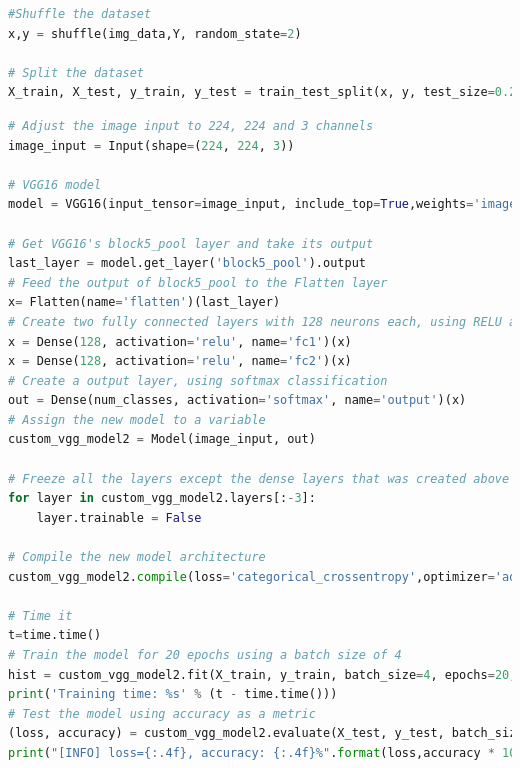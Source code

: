 \begin{lstlisting}[frame=single, language=Python, label={code:shuffle_and_split_data}, caption={Code to shuffle and split the data to 80\% training and 20\% test.}]
#Shuffle the dataset
x,y = shuffle(img_data,Y, random_state=2)

# Split the dataset
X_train, X_test, y_train, y_test = train_test_split(x, y, test_size=0.2, random_state=2)
\end{lstlisting}

\begin{lstlisting}[frame=single, language=Python, label={code:model_creation_and_training}, caption={Code to load VGG16 pre-trained on ImageNet and doing transfer learning.}]
# Adjust the image input to 224, 224 and 3 channels
image_input = Input(shape=(224, 224, 3))

# VGG16 model
model = VGG16(input_tensor=image_input, include_top=True,weights='imagenet')

# Get VGG16's block5_pool layer and take its output
last_layer = model.get_layer('block5_pool').output
# Feed the output of block5_pool to the Flatten layer
x= Flatten(name='flatten')(last_layer)
# Create two fully connected layers with 128 neurons each, using RELU activation
x = Dense(128, activation='relu', name='fc1')(x)
x = Dense(128, activation='relu', name='fc2')(x)
# Create a output layer, using softmax classification
out = Dense(num_classes, activation='softmax', name='output')(x)
# Assign the new model to a variable
custom_vgg_model2 = Model(image_input, out)

# Freeze all the layers except the dense layers that was created above
for layer in custom_vgg_model2.layers[:-3]:
	layer.trainable = False

# Compile the new model architecture
custom_vgg_model2.compile(loss='categorical_crossentropy',optimizer='adadelta',metrics=['accuracy'])

# Time it
t=time.time()
# Train the model for 20 epochs using a batch size of 4
hist = custom_vgg_model2.fit(X_train, y_train, batch_size=4, epochs=20, verbose=1, validation_data=(X_test, y_test))
print('Training time: %s' % (t - time.time()))
# Test the model using accuracy as a metric
(loss, accuracy) = custom_vgg_model2.evaluate(X_test, y_test, batch_size=10, verbose=1)
print("[INFO] loss={:.4f}, accuracy: {:.4f}%".format(loss,accuracy * 100))
\end{lstlisting}



